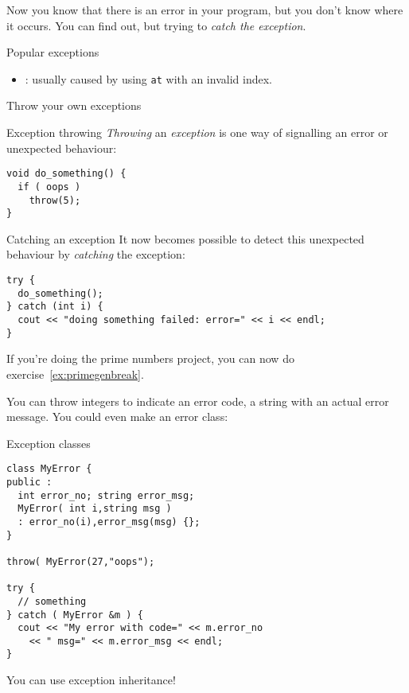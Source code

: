 Now you know that there is an error in your program, but
you don't know where it occurs.
You can find out, but trying to
\emph{catch the exception}.


 {Popular exceptions}

\begin{itemize}
\item {}: usually caused by using \lstinline{at}
  with an invalid index.
\end{itemize}

 {Throw your own exceptions}
\label{sec:except-throw}

\begin{block}{Exception throwing}
  \label{sl:exception-throw}
  \emph{Throwing} an \emph{exception} is one way of signalling an error or
  unexpected behaviour:
\begin{lstlisting}
void do_something() {
  if ( oops )
    throw(5);
}
\end{lstlisting}
\end{block}

\begin{block}{Catching an exception}
  \label{sl:exception-catch}
  It now becomes possible to detect this unexpected behaviour by
  \emph{catching}
  the exception:
\begin{lstlisting}
try {
  do_something();
} catch (int i) {
  cout << "doing something failed: error=" << i << endl;
}
\end{lstlisting}
\end{block}

If you're doing the prime numbers project, you can now
do exercise~\ref{ex:primegenbreak}.

You can throw integers to indicate an error code, a string with an
actual error message. You could even make an error class:

\begin{block}{Exception classes}
  \label{sl:exception-class}
\begin{lstlisting}
class MyError {
public :
  int error_no; string error_msg;
  MyError( int i,string msg )
  : error_no(i),error_msg(msg) {};
}

throw( MyError(27,"oops");

try {
  // something
} catch ( MyError &m ) {
  cout << "My error with code=" << m.error_no
    << " msg=" << m.error_msg << endl;
}
\end{lstlisting}
You can use exception inheritance!
\end{block}

